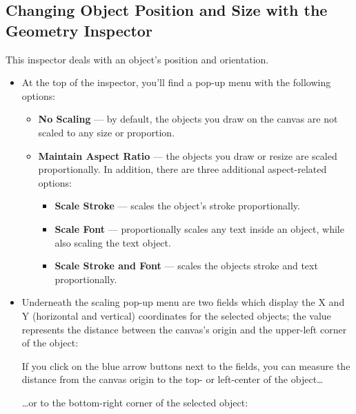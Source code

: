 \documentclass[../main.tex]{subfiles}
\begin{document}
\subsection{Changing Object Position and Size with the Geometry Inspector}

This inspector deals with an object's position and orientation.


\begin{itemize}
  \item At the top of the inspector, you'll find a pop-up menu with the following options:

    \begin{itemize}
      \item \textbf{No Scaling} --- by default, the objects you draw on the canvas are not scaled
        to any size or proportion.
      \item \textbf{Maintain Aspect Ratio} --- the objects you draw or resize are scaled
        proportionally. In addition, there are three additional aspect-related options:

        \begin{itemize}
          \item \textbf{Scale Stroke} --- scales the object's stroke proportionally.
          \item \textbf{Scale Font} --- proportionally scales any text inside an object, while also
            scaling the text object.
          \item \textbf{Scale Stroke and Font} --- scales the objects stroke and text
            proportionally.
        \end{itemize}
    \end{itemize}
  \item Underneath the scaling pop-up menu are two fields which display the X and Y (horizontal
    and vertical) coordinates for the selected objects; the value represents the distance
    between the canvas's origin and the upper-left corner of the object:


    If you click on the blue arrow buttons next to the fields, you can measure the distance from
    the canvas origin to the top- or left-center of the object\ldots{}


    \ldots{}or to the bottom-right corner of the selected object:


\end{itemize}
\end{document}
